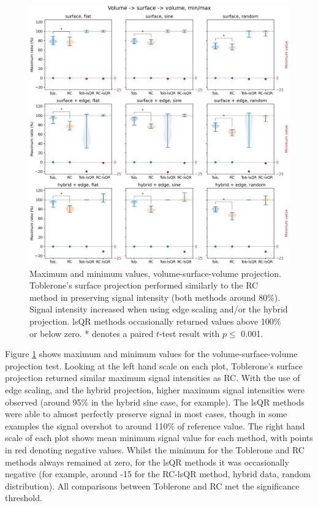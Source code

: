 \documentclass[12pt]{report}
\begin{document}
\begin{figure}[H]
\centering
\includegraphics[width=\textwidth]{VSV_minmax}
\caption{Maximum and minimum values, volume-surface-volume projection. Toblerone's surface projection performed similarly to the RC method in preserving signal intensity (both methods around 80\%). Signal intensity increased when using edge scaling and/or the hybrid projection. lsQR methods occasionally returned values above 100\% or below zero. * denotes a paired $t$-test result with $p\leq $ 0.001.}
\label{VSV_minmax} 
\end{figure}

Figure \ref{VSV_minmax} shows maximum and minimum values for the volume-surface-volume projection test. Looking at the left hand scale on each plot, Toblerone's surface projection returned similar maximum signal intensities as RC. With the use of edge scaling, and the hybrid projection, higher maximum signal intensities were observed (around 95\% in the hybrid sine case, for example). The lsQR methods were able to almost perfectly preserve signal in most cases, though in some examples the signal overshot to around 110\% of reference value. The right hand scale of each plot shows mean minimum signal value for each method, with points in red denoting negative values. Whilst the minimum for the Toblerone and RC methods always remained at zero, for the lsQR methods it was occasionally negative (for example, around -15 for the RC-lsQR method, hybrid data, random distribution). All comparisons  between Toblerone and RC met the significance threshold. 
\end{document}
